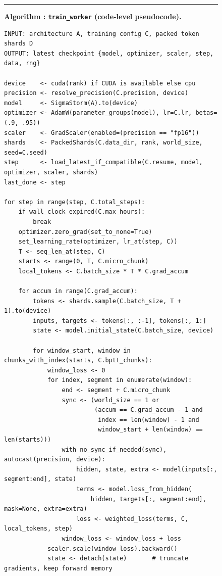 \begin{figure}[!t]
\centering
\begin{minipage}{0.96\textwidth}
\hrule\vspace{1mm}
\textbf{Algorithm \thealgorithm: \texttt{train\_worker} (code-level pseudocode).}\\[-1mm]
\scriptsize
\begin{verbatim}
INPUT: architecture A, training config C, packed token shards D
OUTPUT: latest checkpoint {model, optimizer, scaler, step, data, rng}

device    <- cuda(rank) if CUDA is available else cpu
precision <- resolve_precision(C.precision, device)
model     <- SigmaStorm(A).to(device)
optimizer <- AdamW(parameter_groups(model), lr=C.lr, betas=(.9, .95))
scaler    <- GradScaler(enabled=(precision == "fp16"))
shards    <- PackedShards(C.data_dir, rank, world_size, seed=C.seed)
step      <- load_latest_if_compatible(C.resume, model, optimizer, scaler, shards)
last_done <- step

for step in range(step, C.total_steps):
    if wall_clock_expired(C.max_hours):
        break
    optimizer.zero_grad(set_to_none=True)
    set_learning_rate(optimizer, lr_at(step, C))
    T <- seq_len_at(step, C)
    starts <- range(0, T, C.micro_chunk)
    local_tokens <- C.batch_size * T * C.grad_accum

    for accum in range(C.grad_accum):
        tokens <- shards.sample(C.batch_size, T + 1).to(device)
        inputs, targets <- tokens[:, :-1], tokens[:, 1:]
        state <- model.initial_state(C.batch_size, device)

        for window_start, window in chunks_with_index(starts, C.bptt_chunks):
            window_loss <- 0
            for index, segment in enumerate(window):
                end <- segment + C.micro_chunk
                sync <- (world_size == 1 or
                         (accum == C.grad_accum - 1 and
                          index == len(window) - 1 and
                          window_start + len(window) == len(starts)))
                with no_sync_if_needed(sync), autocast(precision, device):
                    hidden, state, extra <- model(inputs[:, segment:end], state)
                    terms <- model.loss_from_hidden(
                        hidden, targets[:, segment:end], mask=None, extra=extra)
                    loss <- weighted_loss(terms, C, local_tokens, step)
                window_loss <- window_loss + loss
            scaler.scale(window_loss).backward()
            state <- detach(state)       # truncate gradients, keep forward memory


\end{verbatim}
\end{minipage}
\end{figure}
